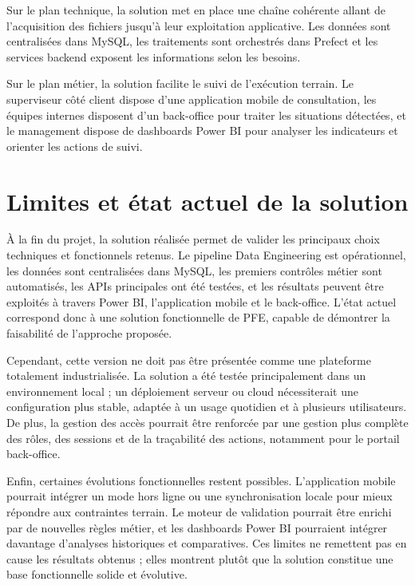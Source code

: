 Sur le plan technique, la solution met en place une chaîne cohérente allant de l’acquisition des fichiers jusqu’à leur exploitation applicative. Les données sont centralisées dans MySQL, les traitements sont orchestrés dans Prefect et les services backend exposent les informations selon les besoins.

Sur le plan métier, la solution facilite le suivi de l’exécution terrain. Le superviseur côté client dispose d’une application mobile de consultation, les équipes internes disposent d’un back-office pour traiter les situations détectées, et le management dispose de dashboards Power BI pour analyser les indicateurs et orienter les actions de suivi.

\section{Limites et état actuel de la solution}

À la fin du projet, la solution réalisée permet de valider les principaux choix techniques et fonctionnels retenus. Le pipeline Data Engineering est opérationnel, les données sont centralisées dans MySQL, les premiers contrôles métier sont automatisés, les APIs principales ont été testées, et les résultats peuvent être exploités à travers Power BI, l’application mobile et le back-office. L’état actuel correspond donc à une solution fonctionnelle de PFE, capable de démontrer la faisabilité de l’approche proposée.

Cependant, cette version ne doit pas être présentée comme une plateforme totalement industrialisée. La solution a été testée principalement dans un environnement local ; un déploiement serveur ou cloud nécessiterait une configuration plus stable, adaptée à un usage quotidien et à plusieurs utilisateurs. De plus, la gestion des accès pourrait être renforcée par une gestion plus complète des rôles, des sessions et de la traçabilité des actions, notamment pour le portail back-office.

Enfin, certaines évolutions fonctionnelles restent possibles. L’application mobile pourrait intégrer un mode hors ligne ou une synchronisation locale pour mieux répondre aux contraintes terrain. Le moteur de validation pourrait être enrichi par de nouvelles règles métier, et les dashboards Power BI pourraient intégrer davantage d’analyses historiques et comparatives. Ces limites ne remettent pas en cause les résultats obtenus ; elles montrent plutôt que la solution constitue une base fonctionnelle solide et évolutive.

